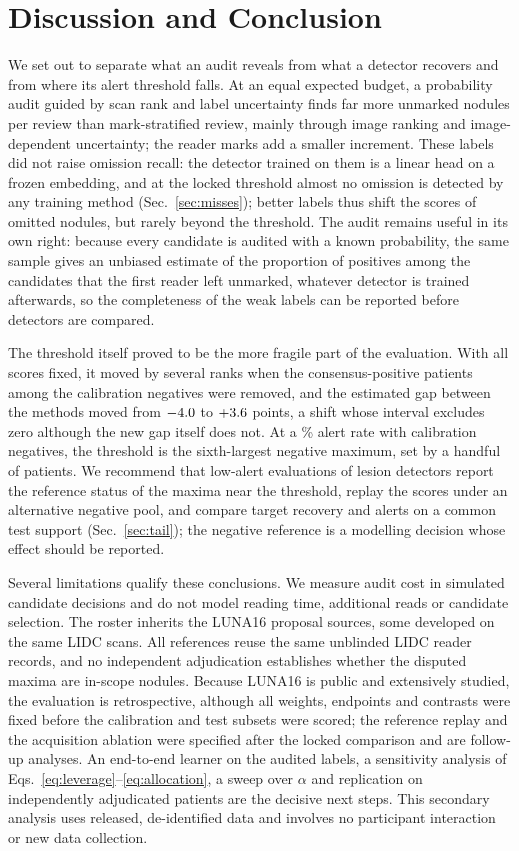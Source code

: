 \section{Discussion and Conclusion}
\label{sec:discussion}
\label{sec:conclusion}

We set out to separate what an audit reveals from what a detector recovers and from where its alert threshold falls. At an equal expected budget, a probability audit guided by scan rank and label uncertainty finds far more unmarked nodules per review than mark-stratified review, mainly through image ranking and image-dependent uncertainty; the reader marks add a smaller increment. These labels did not raise omission recall: the detector trained on them is a linear head on a frozen embedding, and at the locked threshold almost no omission is detected by any training method (Sec.~\ref{sec:misses}); better labels thus shift the scores of omitted nodules, but rarely beyond the threshold. The audit remains useful in its own right: because every candidate is audited with a known probability, the same sample gives an unbiased estimate of the proportion of positives among the candidates that the first reader left unmarked, whatever detector is trained afterwards, so the completeness of the weak labels can be reported before detectors are compared.

The threshold itself proved to be the more fragile part of the evaluation. With all scores fixed, it moved by several ranks when the \NExcluded{} consensus-positive patients among the \PCal{} calibration negatives were removed, and the estimated gap between the methods moved from $-4.0$ to $+3.6$ points, a shift whose interval excludes zero although the new gap itself does not. At a \AlphaPct\% alert rate with \PCal{} calibration negatives, the threshold is the sixth-largest negative maximum, set by a handful of patients. We recommend that low-alert evaluations of lesion detectors report the reference status of the maxima near the threshold, replay the scores under an alternative negative pool, and compare target recovery and alerts on a common test support (Sec.~\ref{sec:tail}); the negative reference is a modelling decision whose effect should be reported.

Several limitations qualify these conclusions. We measure audit cost in simulated candidate decisions and do not model reading time, additional reads or candidate selection. The roster inherits the LUNA16 proposal sources, some developed on the same LIDC scans. All references reuse the same unblinded LIDC reader records, and no independent adjudication establishes whether the disputed maxima are in-scope nodules. Because LUNA16 is public and extensively studied, the evaluation is retrospective, although all weights, endpoints and contrasts were fixed before the calibration and test subsets were scored; the reference replay and the acquisition ablation were specified after the locked comparison and are follow-up analyses. An end-to-end learner on the audited labels, a sensitivity analysis of Eqs.~\eqref{eq:leverage}--\eqref{eq:allocation}, a sweep over $\alpha$ and replication on independently adjudicated patients are the decisive next steps. This secondary analysis uses released, de-identified data and involves no participant interaction or new data collection.
